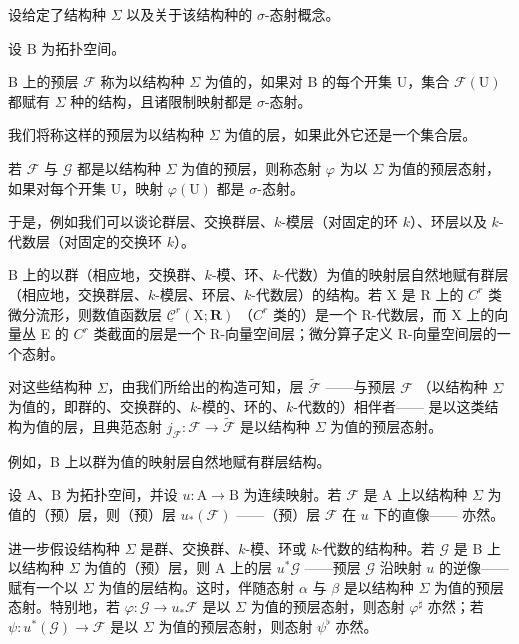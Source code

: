 设给定了结构种 \(\Sigma\) 以及关于该结构种的 \(\sigma\)-态射概念。

设 B 为拓扑空间。

B 上的预层 \(\mathcal{F}\) 称为以结构种 \(\Sigma\) 为值的，如果对 B 的每个开集 U，集合 \(\mathcal{F}(\mathrm{U})\) 都赋有 \(\Sigma\) 种的结构，且诸限制映射都是 \(\sigma\)-态射。

我们将称这样的预层为以结构种 \(\Sigma\) 为值的层，如果此外它还是一个集合层。

若 \(\mathcal{F}\) 与 \(\mathcal{G}\) 都是以结构种 \(\Sigma\) 为值的预层，则称态射 \(\varphi\) 为以 \(\Sigma\) 为值的预层态射，如果对每个开集 U，映射 \(\varphi(\mathrm{U})\) 都是 \(\sigma\)-态射。

于是，例如我们可以谈论群层、交换群层、\(k\)-模层（对固定的环 \(k\)）、环层以及 \(k\)-代数层（对固定的交换环 \(k\)）。

B 上的以群（相应地，交换群、\(k\)-模、环、\(k\)-代数）为值的映射层自然地赋有群层（相应地，交换群层、\(k\)-模层、环层、\(k\)-代数层）的结构。若 X 是 R 上的 \(C^{r}\) 类微分流形，则数值函数层 \(\underline{\mathcal{C}}^{r}(\mathrm{X};\mathbf{R})\) （\(C^{r}\) 类的）是一个 R-代数层，而 X 上的向量丛 E 的 \(C^{r}\) 类截面的层是一个 R-向量空间层；微分算子定义 R-向量空间层的一个态射。

对这些结构种 \(\Sigma\)，由我们所给出的构造可知，层 \(\widetilde{\mathcal{F}}\) ——与预层 \(\mathcal{F}\) （以结构种 \(\Sigma\) 为值的，即群的、交换群的、\(k\)-模的、环的、\(k\)-代数的）相伴者—— 是以这类结构为值的层，且典范态射 \(j_{\mathcal{F}}: \mathcal{F} \to \widetilde{\mathcal{F}}\) 是以结构种 \(\Sigma\) 为值的预层态射。

例如，B 上以群为值的映射层自然地赋有群层结构。

设 A、B 为拓扑空间，并设 \(u\colon\mathrm{A}\to\mathrm{B}\) 为连续映射。若 \(\mathcal{F}\) 是 A 上以结构种 \(\Sigma\) 为值的（预）层，则（预）层 \(u_{*}(\mathcal{F})\) ——（预）层 \(\mathcal{F}\) 在 \(u\) 下的直像—— 亦然。

进一步假设结构种 \(\Sigma\) 是群、交换群、\(k\)-模、环或 \(k\)-代数的结构种。若 \(\mathcal{G}\) 是 B 上以结构种 \(\Sigma\) 为值的（预）层，则 A 上的层 \(u^{*}\mathcal{G}\) ——预层 \(\mathcal{G}\) 沿映射 \(u\) 的逆像—— 赋有一个以 \(\Sigma\) 为值的层结构。这时，伴随态射 \(\alpha\) 与 \(\beta\) 是以结构种 \(\Sigma\) 为值的预层态射。特别地，若 \(\varphi: \mathcal{G} \to u_{*}\mathcal{F}\) 是以 \(\Sigma\) 为值的预层态射，则态射 \(\varphi^{\sharp}\) 亦然；若 \(\psi: u^{*}(\mathcal{G}) \to \mathcal{F}\) 是以 \(\Sigma\) 为值的预层态射，则态射 \(\psi^{\flat}\) 亦然。


